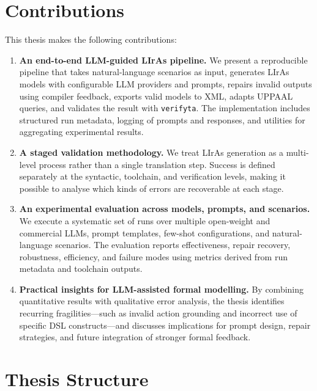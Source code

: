 \section{Contributions}
\label{sec:contributions}

This thesis makes the following contributions:

\begin{enumerate}
    \item \textbf{An end-to-end LLM-guided LIrAs pipeline.}
    We present a reproducible pipeline that takes natural-language scenarios as input, generates LIrAs models with configurable LLM providers and prompts, repairs invalid outputs using compiler feedback, exports valid models to XML, adapts UPPAAL queries, and validates the result with \texttt{verifyta}.
    The implementation includes structured run metadata, logging of prompts and responses, and utilities for aggregating experimental results.

    \item \textbf{A staged validation methodology.}
    We treat LIrAs generation as a multi-level process rather than a single translation step.
    Success is defined separately at the syntactic, toolchain, and verification levels, making it possible to analyse which kinds of errors are recoverable at each stage.

    \item \textbf{An experimental evaluation across models, prompts, and scenarios.}
    We execute a systematic set of runs over multiple open-weight and commercial LLMs, prompt templates, few-shot configurations, and natural-language scenarios.
    The evaluation reports effectiveness, repair recovery, robustness, efficiency, and failure modes using metrics derived from run metadata and toolchain outputs.

    \item \textbf{Practical insights for LLM-assisted formal modelling.}
    By combining quantitative results with qualitative error analysis, the thesis identifies recurring fragilities---such as invalid action grounding and incorrect use of specific DSL constructs---and discusses implications for prompt design, repair strategies, and future integration of stronger formal feedback.
\end{enumerate}

\section{Thesis Structure}
\label{sec:thesis_structure}

